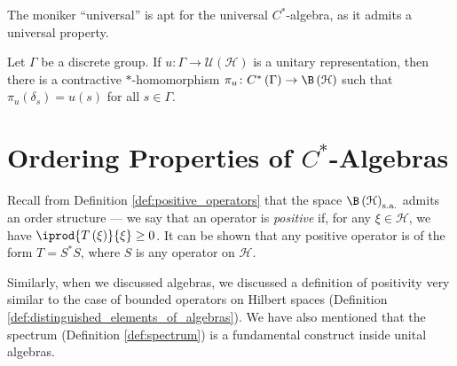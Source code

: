 The moniker ``universal'' is apt for the universal $C^{\ast}$-algebra, as it admits a universal property.
\begin{theorem}
  Let $\Gamma$ be a discrete group. If $u\colon \Gamma\rightarrow \mathcal{U}\left( \mathcal{H} \right)$ is a unitary representation, then there is a contractive $\ast$-homomorphism $\pi_u\colon C^{\ast}\left( \Gamma \right)\rightarrow \B\left( \mathcal{H} \right)$ such that $\pi_u\left( \delta_s \right) = u(s)$ for all $s\in\Gamma$.
  \begin{center}
  \end{center}
\end{theorem}
\section{Ordering Properties of \texorpdfstring{$C^{\ast}$-Algebras}{C*-Algebras}}%
Recall from Definition \ref{def:positive_operators} that the space $\B\left( \mathcal{H} \right)_{\sa}$ admits an order structure --- we say that an operator is \textit{positive} if, for any $\xi\in \mathcal{H}$, we have $ \iprod{T\left( \xi \right)}{\xi} \geq 0 $. It can be shown that any positive operator is of the form $T = S^{\ast}S$, where $S$ is any operator on $\mathcal{H}$.\newline

Similarly, when we discussed algebras, we discussed a definition of positivity very similar to the case of bounded operators on Hilbert spaces (Definition \ref{def:distinguished_elements_of_algebras}). We have also mentioned that the spectrum (Definition \ref{def:spectrum}) is a fundamental construct inside unital algebras.\newline

